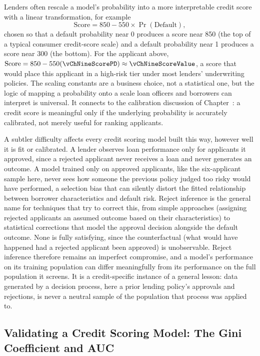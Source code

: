 \documentclass[../ai_in_finance]{subfiles}
\begin{document}
Lenders often rescale a model's probability into a more interpretable credit score with a linear transformation, for example
\begin{equation*}
\text{Score} = 850 - 550 \times \Pr(\text{Default}),
\end{equation*}
chosen so that a default probability near 0 produces a score near 850 (the top of a typical consumer credit-score scale) and a default probability near 1 produces a score near 300 (the bottom). For the applicant above, $\text{Score} = 850 - 550(\vChNineScorePD) \approx \vChNineScoreValue$, a score that would place this applicant in a high-risk tier under most lenders' underwriting policies.
The scaling constants are a business choice, not a statistical one, but the logic of mapping a probability onto a scale loan officers and borrowers can interpret is universal. It connects to the calibration discussion of Chapter~: a credit score is meaningful only if the underlying probability is accurately calibrated, not merely useful for ranking applicants.

A subtler difficulty affects every credit scoring model built this way, however well it is fit or calibrated. A lender observes loan performance only for applicants it approved, since a rejected applicant never receives a loan and never generates an outcome. A model trained only on approved applicants, like the six-applicant sample here, never sees how someone the previous policy judged too risky would have performed, a selection bias that can silently distort the fitted relationship between borrower characteristics and default risk.
Reject inference is the general name for techniques that try to correct this, from simple approaches (assigning rejected applicants an assumed outcome based on their characteristics) to statistical corrections that model the approval decision alongside the default outcome. None is fully satisfying, since the counterfactual (what would have happened had a rejected applicant been approved) is unobservable. Reject inference therefore remains an imperfect compromise, and a model's performance on its training population can differ meaningfully from its performance on the full population it screens.
It is a credit-specific instance of a general lesson: data generated by a decision process, here a prior lending policy's approvals and rejections, is never a neutral sample of the population that process was applied to.

\subsection{Validating a Credit Scoring Model: The Gini Coefficient and AUC}
\label{sec:credit-model-validation}
\end{document}
